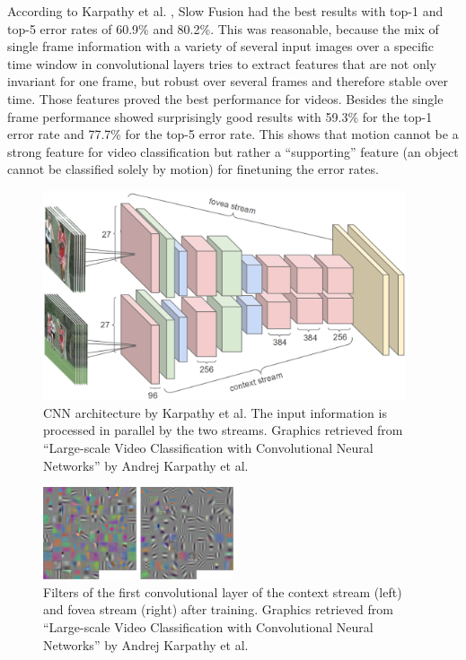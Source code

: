 \documentclass[12pt,twoside]{article}
\theoremstyle{plain}
\theoremstyle{definition}
\theoremstyle{remark}
\begin{document}
According to Karpathy et al. \cite{GoogleLargeScaleVideoClassification-Karpathy}, Slow Fusion had the best results with top-1 and top-5 error rates of 60.9\% and 80.2\%. This was reasonable, because the mix of single frame information with a variety of several input images over a specific time window in convolutional layers tries to extract features that are not only invariant for one frame, but robust over several frames and therefore stable over time.
Those features proved the best performance for videos. Besides the single frame performance showed surprisingly good results with 59.3\% for the top-1 error rate and 77.7\% for the top-5 error rate. This shows that motion cannot be a strong feature for video classification but rather a \enquote{supporting} feature (an object cannot be classified solely by motion) for finetuning the error rates.

\begin{figure}
	\centerline{
		\includegraphics[width=0.95\textwidth]{google-architecture.png}
	}
	{\caption{CNN architecture by Karpathy et al. The input information is processed in parallel by the two streams. Graphics retrieved from \enquote{Large-scale Video Classification with Convolutional Neural Networks} by Andrej Karpathy et al. \cite{GoogleLargeScaleVideoClassification-Karpathy}}\label{fig:google-architecture-two-streams}}
\end{figure}

\begin{figure}
	\vspace{-15pt}
	\centerline{
		\includegraphics[width=0.5\textwidth]{GoogleVideoFilters.pdf}
	}
	{\caption{Filters of the first convolutional layer of the context stream (left) and fovea stream (right) after training. Graphics retrieved from \enquote{Large-scale Video Classification with Convolutional Neural Networks} by Andrej Karpathy et al. \cite{GoogleLargeScaleVideoClassification-Karpathy}}\label{fig:google-architecture-learned-filters}
		}
\end{figure}
\end{document}
